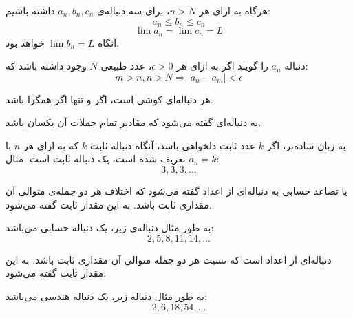\begin{THEOREM}
\p
{}
هرگاه به ازای هر 
$n > N$،
برای سه دنباله‌ی
$a_n , b_n , c_n$
داشته باشیم:
$$a_n \leq b_n \leq c_n$$
$$\lim a_n = \lim c_n = L$$
آنگاه $\lim b_n = L$ خواهد بود.
\end{THEOREM}


\begin{DEFINITION}
	\p
دنباله 
$a_n$
را
گویند اگر به ازای هر
$\epsilon > 0$،
عدد طبیعی
$N$
وجود داشته باشد که:
$$m > n, n > N \Rightarrow |a_n - a_m| < \epsilon$$
\end{DEFINITION}


  
    \begin{THEOREM}
      هر دنباله‌ای کوشی است، اگر و تنها اگر همگرا باشد.
    \end{THEOREM}






\begin{DEFINITION}
  \p
  به دنباله‌ای گفته می‌شود که مقادیر تمام جملات آن یکسان باشد.
\end{DEFINITION}

\p
به زبان ساده‌تر، اگر
$k$
عدد ثابت دلخواهی باشد، آنگاه دنباله ثابت 
$k$
که به ازای هر 
$n$
با 
$a_n = k$
تعریف شده است، 
یک دنباله ثابت است.
مثال:
$$3, 3, 3, ...$$




\begin{DEFINITION}
    \p
    یا تصاعد حسابی به دنباله‌ای از اعداد گفته می‌شود که اختلاف هر دو جمله‌ی متوالی آن مقداری ثابت باشد. به این مقدار ثابت 
      گفته می‌شود.
\end{DEFINITION}
  \p
به طور مثال دنباله‌ی زیر، یک دنباله‌ حسابی می‌باشد:
$$2, 5, 8, 11, 14, ...$$







\begin{DEFINITION}
    \p
    دنباله‌ای از اعداد است که نسبت هر دو جمله متوالی آن مقداری ثابت باشد. به این مقدار ثابت 
  گفته می‌شود.    
\end{DEFINITION}
  \p
به طور مثال دنباله زیر، یک دنباله هندسی می‌باشد:
$$2, 6, 18, 54, ...$$




